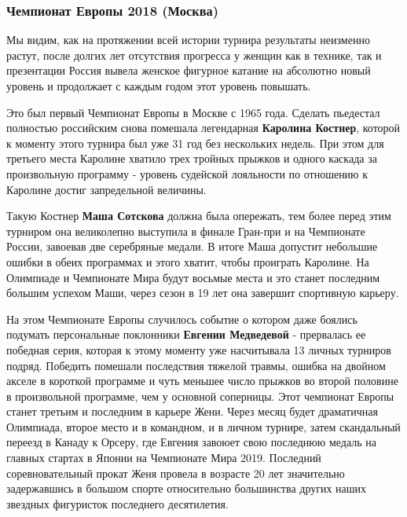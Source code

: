  
 
 
 
 
\subsubsection{Чемпионат Европы 2018 (Москва)}

Мы видим, как на протяжении всей истории турнира результаты неизменно растут,
после долгих лет отсутствия прогресса у женщин как в технике, так и презентации
Россия вывела женское фигурное катание на абсолютно новый уровень и продолжает
с каждым годом этот уровень повышать. 


Это был первый Чемпионат Европы в Москве с 1965 года. Сделать пьедестал
полностью российским снова помешала легендарная \textbf{Каролина Костнер}, которой к
моменту этого турнира был уже 31 год без нескольких недель. При этом для
третьего места Каролине хватило трех тройных прыжков и одного каскада за
произвольную программу - уровень судейской лояльности по отношению к Каролине
достиг запредельной величины.


Такую Костнер \textbf{Маша Сотскова} должна была опережать, тем более перед этим
турниром она великолепно выступила в финале Гран-при и на Чемпионате России,
завоевав две серебряные медали. В итоге Маша допустит небольшие ошибки в обеих
программах и этого хватит, чтобы проиграть Каролине. На Олимпиаде и Чемпионате
Мира будут восьмые места и это станет последним большим успехом Маши, через
сезон в 19 лет она завершит спортивную карьеру.

На этом Чемпионате Европы случилось событие о котором даже боялись подумать
персональные поклонники \textbf{Евгении Медведевой} - прервалась ее победная серия,
которая к этому моменту уже насчитывала 13 личных турниров подряд. Победить
помешали последствия тяжелой травмы, ошибка на двойном акселе в короткой
программе и чуть меньшее число прыжков во второй половине в произвольной
программе, чем у основной соперницы. Этот чемпионат Европы станет третьим и
последним в карьере Жени. Через месяц будет драматичная Олимпиада, второе место
и в командном, и в личном турнире, затем скандальный переезд в Канаду к Орсеру,
где Евгения завоюет свою последнюю медаль на главных стартах в Японии на
Чемпионате Мира 2019. Последний соревновательный прокат Женя провела в возрасте
20 лет значительно задержавшись в большом спорте относительно большинства
других наших звездных фигуристок последнего десятилетия.

